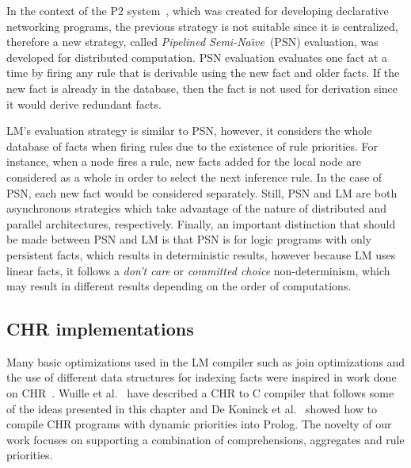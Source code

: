 In the context of the P2 system~\cite{Loo-condie-garofalakis-p2}, which was
created for developing declarative networking programs, the previous strategy is
not suitable since it is centralized, therefore a new strategy, called
\emph{Pipelined Semi-Na\"{\i}ve}~(PSN) evaluation, was developed for distributed
computation. PSN evaluation evaluates one fact at a time by firing any rule that
is derivable using the new fact and older facts. If the new fact is already in
the database, then the fact is not used for derivation since it would derive
redundant facts.

LM's evaluation strategy is similar to PSN, however, it considers the whole
database of facts when firing rules due to the existence of rule priorities.
For instance, when a node fires a rule, new facts added for the local node are
considered as a whole in order to select the next inference rule. In the case of
PSN, each new fact would be considered separately. Still, PSN and LM are both
asynchronous strategies which take advantage of the nature of distributed and
parallel architectures, respectively. Finally, an important distinction that
should be made between PSN and LM is that PSN is for logic programs with only
persistent facts, which results in deterministic results, however because LM
uses linear facts, it follows a \emph{don't care} or \emph{committed choice}
non-determinism, which may result in different results depending on the order of
computations.

\subsection{CHR implementations}

Many basic optimizations used in the LM compiler such as join optimizations and
the use of different data structures for indexing facts were inspired in work
done on CHR~\cite{DBLP:journals/corr/cs-PL-0408025}.  Wuille et al.~\cite{42866}
have described a CHR to C compiler that follows some of the ideas presented in
this chapter and De Koninck et al.~\cite{chrp} showed how to compile CHR
programs with dynamic priorities into Prolog. The novelty of our work focuses on
supporting a combination of comprehensions, aggregates and rule priorities.
